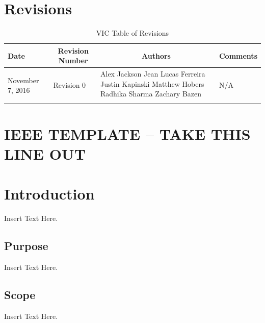 \documentclass [12pt]{article}
\begin{document}

\pagebreak

\tableofcontents
\listoftables

\pagebreak


\section{Revisions}
\begin{longtable}{| p{ } | p{ } | p{ } | p{ } |}

\hline 
\centering \textbf{Date} & 
\multicolumn{1}{c}{\textbf {Revision Number}} &
\multicolumn{1}{|c}{\textbf {Authors}} & 
\multicolumn{1}{|c|}{\textbf {Comments}} \\ \hline

\multirow{4}{*}{\centering November 7, 2016}  & 
\multirow{4}{*}{Revision 0}& 
{Alex Jackson \newline
Jean Lucas Ferreira \newline
Justin Kapinski\newline
Matthew Hobers\newline
Radhika Sharma\newline
Zachary Bazen}
&
 \multirow{4}{*}{N/A} \\ 
\hline 

\caption{VIC Table of Revisions} 
\end{longtable}
\pagebreak


\section*{IEEE TEMPLATE -- TAKE THIS LINE OUT}



\section{Introduction}
Insert Text Here.

\subsection{Purpose} 
Insert Text Here.

\subsection{Scope} 
Insert Text Here.
\end{document}

